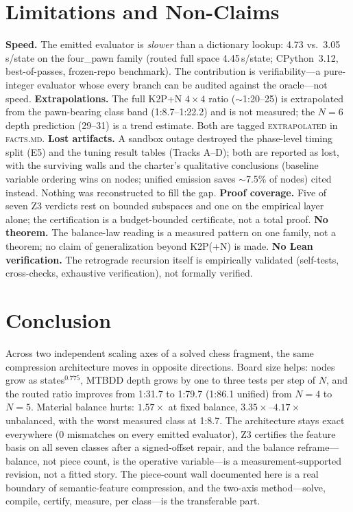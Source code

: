 \documentclass[conference]{IEEEtran}
\newcommand{\tiere}{\textsc{extrapolated}}
\begin{document}
\section{Limitations and Non-Claims}
\label{sec:limits}
\textbf{Speed.} The emitted evaluator is \emph{slower} than a dictionary
lookup: 4.73 vs.\ 3.05\,\textmu s/state on the four\_pawn family (routed
full space 4.45\,\textmu s/state; CPython~3.12, best-of-passes, frozen-repo
benchmark). The contribution is verifiability---a pure-integer evaluator
whose every branch can be audited against the oracle---not speed.
\textbf{Extrapolations.} The full K2P+N $4\times4$ ratio ($\sim$1:20--25)
is extrapolated from the pawn-bearing class band (1:8.7--1:22.2) and is not
measured; the $N{=}6$ depth prediction (29--31) is a trend estimate. Both
are tagged \tiere{} in \textsc{facts.md}.
\textbf{Lost artifacts.} A sandbox outage destroyed the phase-level timing
split (E5) and the tuning result tables (Tracks A--D); both are reported as
lost, with the surviving walls and the charter's qualitative conclusions
(baseline variable ordering wins on nodes; unified emission saves
$\sim$7.5\% of nodes) cited instead. Nothing was reconstructed to fill the
gap.
\textbf{Proof coverage.} Five of seven Z3 verdicts rest on bounded subspaces
and one on the empirical layer alone; the certification is a budget-bounded
certificate, not a total proof.
\textbf{No theorem.} The balance-law reading is a measured pattern on one
family, not a theorem; no claim of generalization beyond K2P(+N) is made.
\textbf{No Lean verification.} The retrograde recursion itself is
empirically validated (self-tests, cross-checks, exhaustive verification),
not formally verified.

\section{Conclusion}
Across two independent scaling axes of a solved chess fragment, the same
compression architecture moves in opposite directions. Board size helps:
nodes grow as states$^{0.775}$, MTBDD depth grows by one to three tests
per step of $N$, and the
routed ratio improves from 1:31.7 to 1:79.7 (1:86.1 unified) from $N{=}4$
to $N{=}5$. Material balance hurts: $1.57\times$ at fixed balance,
$3.35\times$--$4.17\times$ unbalanced, with the worst measured class at
1:8.7. The architecture stays exact everywhere (0 mismatches on every
emitted evaluator), Z3 certifies the feature basis on all seven classes
after a signed-offset repair, and the balance reframe---balance, not piece
count, is the operative variable---is a measurement-supported revision, not
a fitted story. The piece-count wall documented here is a real boundary of
semantic-feature compression, and the two-axis method---solve, compile,
certify, measure, per class---is the transferable part.
\end{document}
